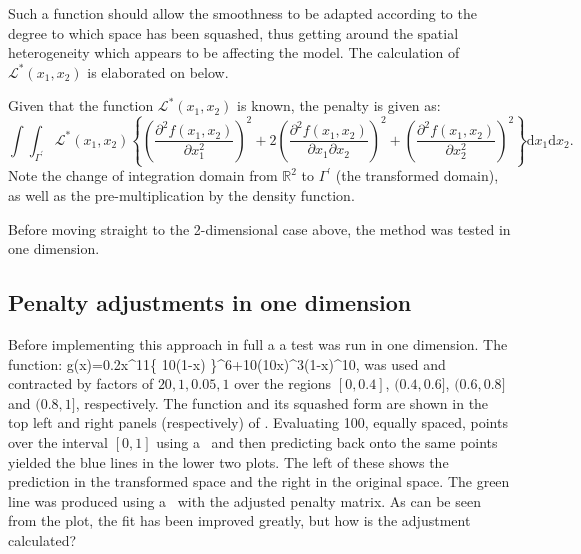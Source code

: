 Such a function should allow the smoothness to be adapted according to the degree to which space has been squashed, thus getting around the spatial heterogeneity which appears to be affecting the model. The calculation of $\mathcal{L}^*(x_1,x_2)$ is elaborated on below.

Given that the function $\mathcal{L}^*(x_1,x_2)$ is known, the penalty is given as:
\begin{equation}
\int\int_{\Gamma^\prime} \mathcal{L}^*(x_1,x_2) \left \{ \left (\frac{\partial^2 f(x_1,x_2)}{\partial x_1^2}\right )^2 + 2\left (\frac{\partial^2 f(x_1,x_2)}{\partial x_1 \partial x_2}\right )^2 + \left (\frac{\partial^2 f(x_1,x_2)}{\partial x_2^2}\right )^2\right \} \text{d}x_1 \text{d}x_2.
\label{kdeadjust}
\end{equation}
Note the change of integration domain from $\mathbb{R}^2$ to $\Gamma^\prime$ (the transformed domain), as well as the pre-multiplication by the density function.

Before moving straight to the 2-dimensional case above, the method was tested in one dimension.

\subsection{Penalty adjustments in one dimension}

Before implementing this approach in full a a test was run in one dimension. The function:
\be
g(x)=0.2x^{11}\left \{ 10(1-x) \right \}^6+10(10x)^3(1-x)^{10},
\label{hardfcn}
\ee
was used and contracted by factors of $20,1,0.05,1$ over the regions $[0,0.4]$, $(0.4,0.6]$, $(0.6,0.8]$ and $(0.8,1]$, respectively. The function and its squashed form are shown in the top left and right panels (respectively) of . Evaluating 100, equally spaced, points over the interval $[0,1]$ using a \tprs\ and then predicting back onto the same points yielded the blue lines in the lower two plots. The left of these shows the prediction in the transformed space and the right in the original space. The green line was produced using a \tprs\ with the adjusted penalty matrix. As can be seen from the plot, the fit has been improved greatly, but how is the adjustment calculated?

